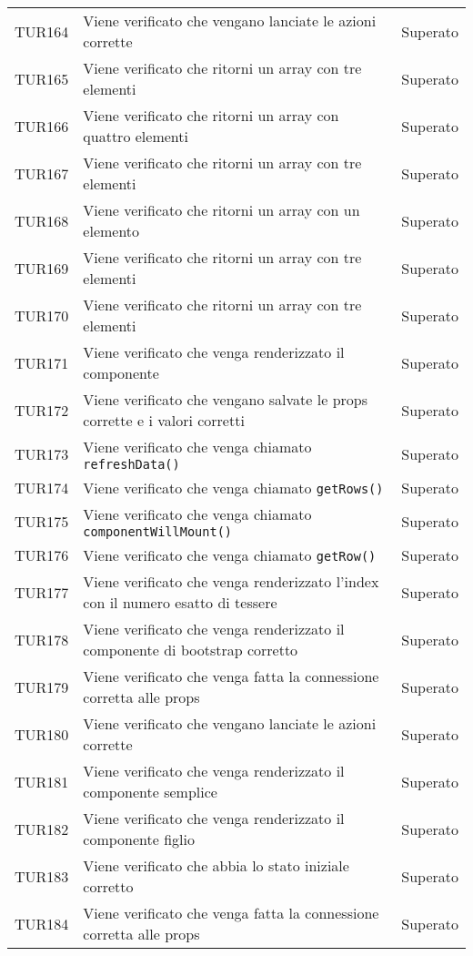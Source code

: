 \documentclass[PianoDiQualifica.tex]{subfiles}
\begin{document}
\begin{longtable}[H]{P{2cm}P{8.5cm}P{3cm}}
	TUR164 & Viene verificato che vengano lanciate le azioni corrette & Superato \\ 
	TUR165 & Viene verificato che ritorni un array con tre elementi & Superato \\ 
	TUR166 & Viene verificato che ritorni un array con quattro elementi & Superato \\ 
	TUR167 & Viene verificato che ritorni un array con tre elementi & Superato \\ 
	TUR168 & Viene verificato che ritorni un array con un elemento & Superato \\ 
	TUR169 & Viene verificato che ritorni un array con tre elementi & Superato \\ 
	TUR170 & Viene verificato che ritorni un array con tre elementi & Superato \\ 
	TUR171 & Viene verificato che venga renderizzato il componente & Superato \\ 
	TUR172 & Viene verificato che vengano salvate le props corrette e i valori corretti & Superato \\ 
	TUR173 & Viene verificato che venga chiamato \texttt{refreshData()} & Superato \\ 
	TUR174 & Viene verificato che venga chiamato \texttt{getRows()} & Superato \\ 
	TUR175 & Viene verificato che venga chiamato \texttt{componentWillMount()} & Superato \\ 
	TUR176 & Viene verificato che venga chiamato \texttt{getRow()} & Superato \\
	TUR177 & Viene verificato che venga renderizzato l'index con il numero esatto di tessere & Superato \\
	TUR178 & Viene verificato che venga renderizzato il componente di bootstrap corretto & Superato \\
	TUR179 & Viene verificato che venga fatta la connessione corretta alle props & Superato \\
	TUR180 & Viene verificato che vengano lanciate le azioni corrette & Superato \\
	TUR181 & Viene verificato che venga renderizzato il componente semplice & Superato \\
	TUR182 & Viene verificato che venga renderizzato il componente figlio & Superato \\
	TUR183 & Viene verificato che abbia lo stato iniziale corretto & Superato \\
	TUR184 & Viene verificato che venga fatta la connessione corretta alle props & Superato \\

\end{longtable}
\end{document}
